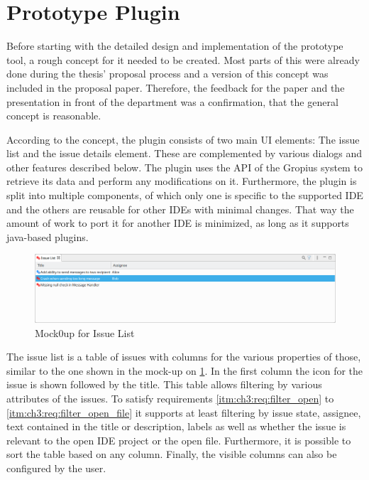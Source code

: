 \section{Prototype Plugin}
\label{sec:ch3:s3}
Before starting with the detailed design and implementation of the prototype tool, a rough concept for it needed to be created.
Most parts of this were already done during the thesis' proposal process and a version of this concept was included in the proposal paper.
Therefore, the feedback for the paper and the presentation in front of the department was a confirmation, that the general concept is reasonable.

According to the concept, the plugin consists of two main \gls{UI} elements: The issue list and the issue details element.
These are complemented by various dialogs and other features described below.
The plugin uses the \gls{API} of the Gropius system \cite{speth2020gropius} to retrieve its data and perform any modifications on it.
Furthermore, the plugin is split into multiple components, 
of which only one is specific to the supported \gls{IDE} 
and the others are reusable for other \glspl{IDE} with minimal changes.
That way the amount of work to port it for another \gls{IDE} is minimized,
as long as it supports java-based plugins.

\begin{figure}[!h]
	\centering
	\includegraphics[width=\textwidth]{graphics/concept_mockup_issueList.png}
	\caption{Mock0up for Issue List}
	\label{fig:c3:mockup_issueList}
\end{figure}
The issue list is a table of issues with columns for the various properties of those, 
similar to the one shown in the mock-up on \cref{fig:c3:mockup_issueList}.
In the first column the icon for the issue is shown followed by the title.
This table allows filtering by various attributes of the issues.
To satisfy requirements \ref{itm:ch3:req:filter_open} to \ref{itm:ch3:req:filter_open_file} it supports at least filtering
by issue state, assignee, text contained in the title or description, 
labels as well as whether the issue is relevant to the open \gls{IDE} project or the open file.
Furthermore, it is possible to sort the table based on any column. 
Finally, the visible columns can also be configured by the user.

